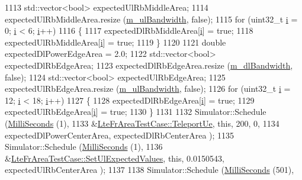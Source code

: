 \begin{DoxyCode}
1113   std::vector<bool> expectedUlRbMiddleArea;
1114   expectedUlRbMiddleArea.resize (\hyperlink{classLteFrAreaTestCase_afa54487d9f12658bbead39e1272f4d8c}{m\_ulBandwidth}, \textcolor{keyword}{false});
1115   \textcolor{keywordflow}{for} (uint32\_t \hyperlink{bernuolliDistribution_8m_a6f6ccfcf58b31cb6412107d9d5281426}{i} = 0; \hyperlink{bernuolliDistribution_8m_a6f6ccfcf58b31cb6412107d9d5281426}{i} < 6; \hyperlink{bernuolliDistribution_8m_a6f6ccfcf58b31cb6412107d9d5281426}{i}++)
1116     \{
1117       expectedDlRbMiddleArea[\hyperlink{bernuolliDistribution_8m_a6f6ccfcf58b31cb6412107d9d5281426}{i}] = \textcolor{keyword}{true};
1118       expectedUlRbMiddleArea[\hyperlink{bernuolliDistribution_8m_a6f6ccfcf58b31cb6412107d9d5281426}{i}] = \textcolor{keyword}{true};
1119     \}
1120 
1121   \textcolor{keywordtype}{double} expectedDlPowerEdgeArea = 2.0;
1122   std::vector<bool> expectedDlRbEdgeArea;
1123   expectedDlRbEdgeArea.resize (\hyperlink{classLteFrAreaTestCase_a645fc2cea287afbd373f6d702152cf47}{m\_dlBandwidth}, \textcolor{keyword}{false});
1124   std::vector<bool> expectedUlRbEdgeArea;
1125   expectedUlRbEdgeArea.resize (\hyperlink{classLteFrAreaTestCase_afa54487d9f12658bbead39e1272f4d8c}{m\_ulBandwidth}, \textcolor{keyword}{false});
1126   \textcolor{keywordflow}{for} (uint32\_t \hyperlink{bernuolliDistribution_8m_a6f6ccfcf58b31cb6412107d9d5281426}{i} = 12; \hyperlink{bernuolliDistribution_8m_a6f6ccfcf58b31cb6412107d9d5281426}{i} < 18; \hyperlink{bernuolliDistribution_8m_a6f6ccfcf58b31cb6412107d9d5281426}{i}++)
1127     \{
1128       expectedDlRbEdgeArea[\hyperlink{bernuolliDistribution_8m_a6f6ccfcf58b31cb6412107d9d5281426}{i}] = \textcolor{keyword}{true};
1129       expectedUlRbEdgeArea[\hyperlink{bernuolliDistribution_8m_a6f6ccfcf58b31cb6412107d9d5281426}{i}] = \textcolor{keyword}{true};
1130     \}
1131 
1132   Simulator::Schedule (\hyperlink{group__timecivil_gaf26127cf4571146b83a92ee18679c7a9}{MilliSeconds} (1),
1133                        &\hyperlink{classLteFrAreaTestCase_ad644210c338d4e34da3c5d7f0c511269}{LteFrAreaTestCase::TeleportUe}, \textcolor{keyword}{this}, 200, 0,
1134                        expectedDlPowerCenterArea, expectedDlRbCenterArea );
1135   Simulator::Schedule (\hyperlink{group__timecivil_gaf26127cf4571146b83a92ee18679c7a9}{MilliSeconds} (1),
1136                        &\hyperlink{classLteFrAreaTestCase_aac2718dc3703d2ad389f88ffa20d035e}{LteFrAreaTestCase::SetUlExpectedValues}, \textcolor{keyword}{this},
       0.0150543, expectedUlRbCenterArea );
1137 
1138   Simulator::Schedule (\hyperlink{group__timecivil_gaf26127cf4571146b83a92ee18679c7a9}{MilliSeconds} (501),

\end{DoxyCode}
